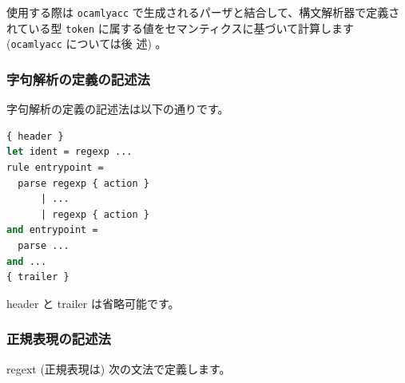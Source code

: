 \documentclass[a4paper,11pt]{jsarticle}
\begin{document}
使用する際は \verb|ocamlyacc| で生成されるパーザと結合して、構文解析器で定義されている型
\verb|token| に属する値をセマンティクスに基づいて計算します (\verb|ocamlyacc| については後
述) 。

\subsubsection{字句解析の定義の記述法}

字句解析の定義の記述法は以下の通りです。

\begin{lstlisting}[language=Caml]
{ header }
let ident = regexp ...
rule entrypoint =
  parse regexp { action }
      | ...
      | regexp { action }
and entrypoint =
  parse ...
and ...
{ trailer }
\end{lstlisting}

header と trailer は省略可能です。

\subsubsection{正規表現の記述法}

regext (正規表現は) 次の文法で定義します。
\end{document}
